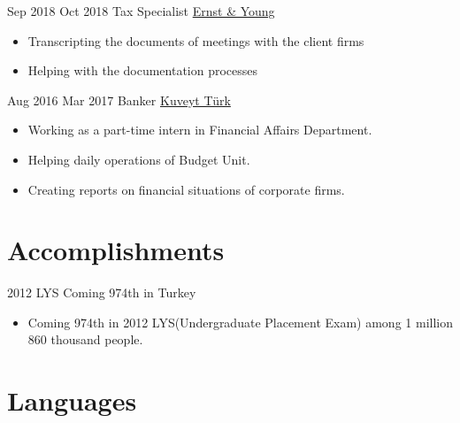 \documentclass[letterpaper]{ramco_class} %
\begin{document}
\begin{twenty} %
	\twentyitem
			{Sep 2018}
			{Oct 2018}
			{\hspace{0.3cm}Tax Specialist}
			{\href{https://www.ey.com/tr/tr/home}{Ernst \& Young}}
			{}
			{\begin{itemize}
			\item Transcripting the documents of meetings with the client firms
			\item Helping with the documentation processes
			\end{itemize}}
	\end{twenty}

\begin{twenty} %
\twentyitem
    	{Aug 2016}
		{Mar 2017}
        {\hspace{0.3cm}Banker}
        {\href{https://www.kuveytturk.com.tr//}{Kuveyt Türk}}
        {}
        {\begin{itemize}
        \item Working as a part-time intern in Financial Affairs Department.
        \item Helping daily operations of Budget Unit.
        \item Creating reports on financial situations of corporate firms.
        \end{itemize}}
\end{twenty}

\section{Accomplishments}

\begin{twenty} %

	\twentyitem
	{2012 LYS}
	{}
	{\hspace{0.3cm}Coming 974th in Turkey}
	{}
	{}
	{\begin{itemize}
			\item Coming 974th in 2012 LYS(Undergraduate Placement Exam) among 1 million 860 thousand people.
	\end{itemize}}
\end{twenty}

\section{Languages}
\end{document}

